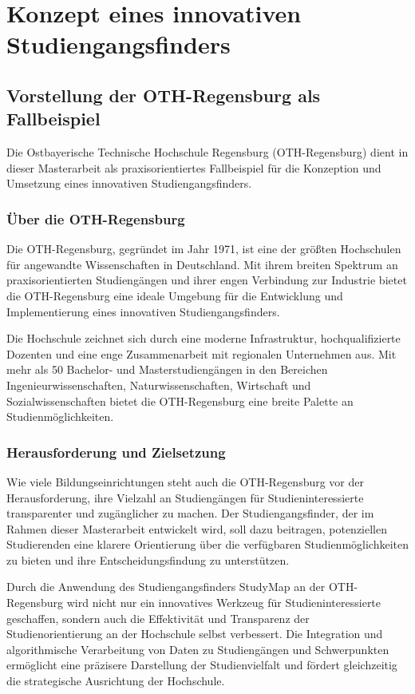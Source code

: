\section{Konzept eines innovativen Studiengangsfinders}
\subsection{Vorstellung der OTH-Regensburg als Fallbeispiel}
Die Ostbayerische Technische Hochschule Regensburg (OTH-Regensburg) dient in
dieser Masterarbeit als praxisorientiertes Fallbeispiel für die Konzeption und 
Umsetzung eines innovativen Studiengangsfinders.

\subsubsection{Über die OTH-Regensburg}
Die OTH-Regensburg, gegründet im Jahr 1971, ist eine der größten Hochschulen
für angewandte Wissenschaften in Deutschland. Mit ihrem breiten Spektrum an 
praxisorientierten Studiengängen und ihrer engen Verbindung zur Industrie bietet
die OTH-Regensburg eine ideale Umgebung für die Entwicklung und Implementierung
eines innovativen Studiengangsfinders. \parencite{regensburg_oth_2023}

Die Hochschule zeichnet sich durch eine moderne Infrastruktur, hochqualifizierte 
Dozenten und eine enge Zusammenarbeit mit regionalen Unternehmen aus. Mit mehr
als 50 Bachelor- und Masterstudiengängen in den Bereichen
Ingenieurwissenschaften, Naturwissenschaften, Wirtschaft und
Sozialwissenschaften bietet die OTH-Regensburg eine breite Palette an 
Studienmöglichkeiten. \parencite{regensburg_oth_2023}

\subsubsection{Herausforderung und Zielsetzung}
Wie viele Bildungseinrichtungen steht auch die OTH-Regensburg vor der
Herausforderung, ihre Vielzahl an Studiengängen für Studieninteressierte
transparenter und zugänglicher zu machen. Der Studiengangsfinder, der im Rahmen
dieser Masterarbeit entwickelt wird, soll dazu beitragen, potenziellen
Studierenden eine klarere Orientierung über die verfügbaren Studienmöglichkeiten
zu bieten und ihre Entscheidungsfindung zu unterstützen.

Durch die Anwendung des Studiengangsfinders StudyMap an der OTH-Regensburg wird nicht nur ein innovatives Werkzeug für Studieninteressierte geschaffen, sondern auch die Effektivität und Transparenz der Studienorientierung an der Hochschule selbst verbessert. Die Integration und algorithmische Verarbeitung von Daten zu Studiengängen und Schwerpunkten ermöglicht eine präzisere Darstellung der Studienvielfalt und fördert gleichzeitig die strategische Ausrichtung der Hochschule.

